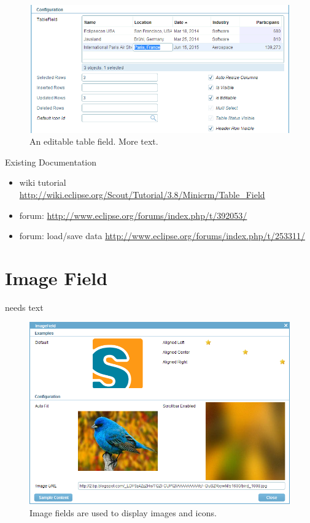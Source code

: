 \documentclass[a4paper,10pt,twoside]{book}
\begin{document}
{\begin{figure}
\includegraphics[width=15cm]{editabletablefield.png}
\caption{An editable table field.
More text.}
\end{figure}

\noindent Existing Documentation
\begin{itemize}
  \item wiki tutorial \url{http://wiki.eclipse.org/Scout/Tutorial/3.8/Minicrm/Table_Field}
  \item forum: \url{http://www.eclipse.org/forums/index.php/t/392053/}
  \item forum: load/save data \url{http://www.eclipse.org/forums/index.php/t/253311/}
\end{itemize}

\section{Image Field}
needs text

\begin{figure}
\includegraphics[width=14cm]{imagefield.png}
\caption{Image fields are used to display images and icons.
}
\end{figure}

}
\end{document}
